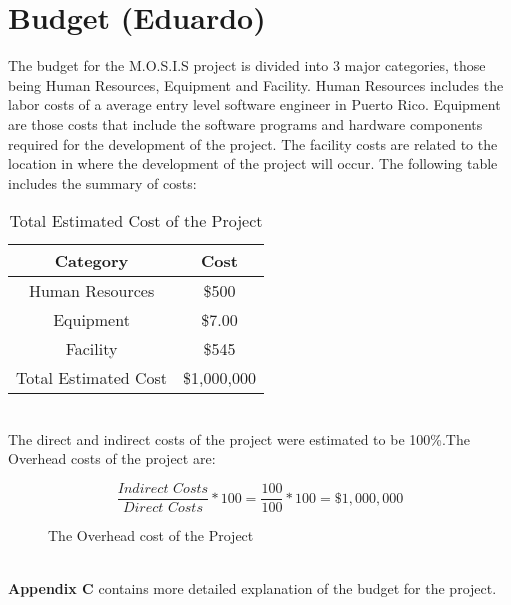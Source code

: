 
 \section{Budget (Eduardo)}
 The budget for the M.O.S.I.S project is divided into 3 major categories, those being Human Resources, Equipment and Facility. Human Resources includes the labor costs of a average entry level software engineer in Puerto Rico\cite{SoftwareEngineerSalary}. Equipment are those costs that include the software programs and hardware components required for the development of the project. The facility costs are related to the location in where the development of the project will occur. The following table includes the summary of costs:
 \begin{table}[h]
    \centering
    \begin{tabular}{||c | c||} 
     \hline
     Category & Cost \\ [0.5ex] 
     \hline\hline
     Human Resources & \$500  \\ 
     \hline
     Equipment & \$7.00  \\
     \hline
     Facility & \$545 \\
     \hline
     Total Estimated Cost & \$1,000,000  \\
     \hline
    \end{tabular}
    \caption {Total Estimated Cost of the Project}
    \label {table:1}
\end{table}
\\ The direct and indirect costs of the project were estimated to be 100\%.The Overhead costs of the project are:
\begin{figure}[h]
   $$\frac{\textit{Indirect Costs}}{\textit{Direct Costs}} * 100 = \frac{100}{100} * 100 = \$ 1,000,000$$
\caption{The Overhead cost of the Project}
\end{figure}
\\\textbf{Appendix C} contains more detailed explanation of the budget for the project.